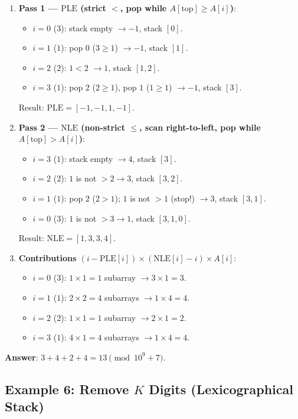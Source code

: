\documentclass[11pt,a4paper]{article}
\theoremstyle{definition}
\begin{document}
\begin{enumerate}
    \item \textbf{Pass 1 --- $\text{PLE}$ (strict $<$, pop while $A[\text{top}] \ge A[i]$)}:
    \begin{itemize}
        \item $i=0$ ($3$): stack empty $\to -1$, stack $[0]$.
        \item $i=1$ ($1$): pop $0$ ($3 \ge 1$) $\to -1$, stack $[1]$.
        \item $i=2$ ($2$): $1 < 2$ $\to 1$, stack $[1, 2]$.
        \item $i=3$ ($1$): pop $2$ ($2 \ge 1$), pop $1$ ($1 \ge 1$) $\to -1$, stack $[3]$.
    \end{itemize}
    Result: $\text{PLE} = [-1, -1, 1, -1]$.

    \item \textbf{Pass 2 --- $\text{NLE}$ (non-strict $\le$, scan right-to-left, pop while $A[\text{top}] > A[i]$)}:
    \begin{itemize}
        \item $i=3$ ($1$): stack empty $\to 4$, stack $[3]$.
        \item $i=2$ ($2$): $1$ is not $> 2 \to 3$, stack $[3, 2]$.
        \item $i=1$ ($1$): pop $2$ ($2 > 1$); $1$ is not $> 1$ (stop!) $\to 3$, stack $[3, 1]$.
        \item $i=0$ ($3$): $1$ is not $> 3 \to 1$, stack $[3, 1, 0]$.
    \end{itemize}
    Result: $\text{NLE} = [1, 3, 3, 4]$.

    \item \textbf{Contributions $(i - \text{PLE}[i]) \times (\text{NLE}[i] - i) \times A[i]$}:
    \begin{itemize}
        \item $i=0$ ($3$): $1 \times 1 = 1$ subarray $\to 3 \times 1 = 3$.
        \item $i=1$ ($1$): $2 \times 2 = 4$ subarrays $\to 1 \times 4 = 4$.
        \item $i=2$ ($2$): $1 \times 1 = 1$ subarray $\to 2 \times 1 = 2$.
        \item $i=3$ ($1$): $4 \times 1 = 4$ subarrays $\to 1 \times 4 = 4$.
    \end{itemize}
\end{enumerate}

\textbf{Answer}: $3 + 4 + 2 + 4 = 13 \pmod{10^9 + 7}$.

\subsection{Example 6: Remove $K$ Digits (Lexicographical Stack)}
\label{ex:remove_k_digits}
\end{document}
